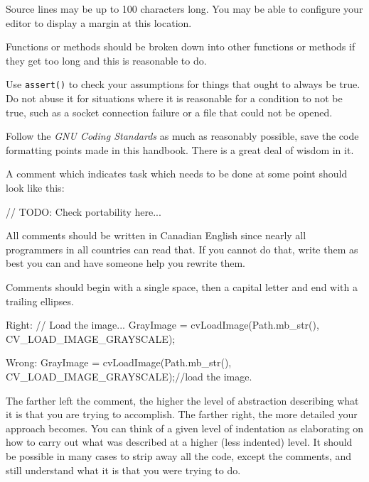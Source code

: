 
\startitemize[4]
\item
Source lines may be up to 100 characters long. You may be able to configure your editor to display a margin at this location.

\item
Functions or methods should be broken down into other functions or methods if they get too long and this is reasonable to do.

\item
Use {\tt assert()} to check your assumptions for things that ought to always be true. Do not abuse it for situations where it is reasonable for a condition to not be true, such as a socket connection failure or a file that could not be opened.

\item
Follow the {\it GNU Coding Standards} as much as reasonably possible, save the code formatting points made in this handbook. There is a great deal of wisdom in it.

\item
A comment which indicates task which needs to be done at some point should look like this: 

\startCodeExample
// TODO: Check portability here...
\stopCodeExample

\stopitemize


\startitemize[4]
\item
All comments should be written in Canadian English since nearly all programmers in all countries can read that. If you cannot do that, write them as best you can and have someone help you rewrite them.

\item
Comments should begin with a single space, then a capital letter and end with a trailing ellipses. 

Right:
\startCodeExample
// Load the image...
GrayImage = cvLoadImage(Path.mb_str(), CV_LOAD_IMAGE_GRAYSCALE);
\stopCodeExample

Wrong:
\startCodeExample
GrayImage = cvLoadImage(Path.mb_str(), CV_LOAD_IMAGE_GRAYSCALE);//load the image.
\stopCodeExample

\item
The farther left the comment, the higher the level of abstraction describing what it is that you are trying to accomplish. The farther right, the more detailed your approach becomes. You can think of a given level of indentation as elaborating on how to carry out what was described at a higher (less indented) level. It should be possible in many cases to strip away all the code, except the comments, and still understand what it is that you were trying to do.


